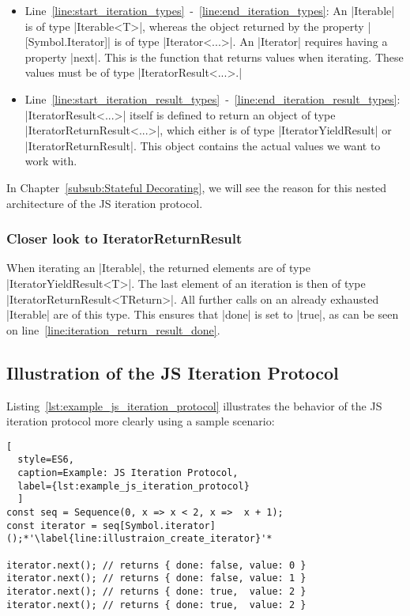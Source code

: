 \begin{itemize}
  \item{Line~\ref{line:start_iteration_types}~-~\ref{line:end_iteration_types}: 
      An |Iterable| is of type |Iterable<T>|, whereas the object returned by the property
      |[Symbol.Iterator]| is of type |Iterator<...>|. An |Iterator| requires having a property |next|. 
      This is the function that returns values when iterating. These values must be 
      of type |IteratorResult<...>.|
    }
  \item{Line~\ref{line:start_iteration_result_types}~-~\ref{line:end_iteration_result_types}:
      |IteratorResult<...>| itself is defined to return an 
      object of type |IteratorReturnResult<...>|, which either is of type
      |IteratorYieldResult| or |IteratorReturnResult|. This object contains the actual 
      values we want to work with.}
\end{itemize}

In Chapter~\ref{subsub:Stateful Decorating}, we will see the reason for this
nested architecture of the JS iteration protocol.

\subsubsection{Closer look to IteratorReturnResult}
\label{subsub:Closer look to IteratorReturnResult}
When iterating an |Iterable|, the returned elements are of type
|IteratorYieldResult<T>|. The last element of an iteration is then of type
|IteratorReturnResult<TReturn>|. All further calls on an already exhausted
|Iterable| are of this type. This ensures that |done| is set to |true|, as 
can be seen on line~\ref{line:iteration_return_result_done}.


\subsection{Illustration of the JS Iteration Protocol}
\label{sub:Illustration of the JS Iteration Protocol}
Listing~\ref{lst:example_js_iteration_protocol} illustrates the behavior of the
JS iteration protocol more clearly using a sample scenario:

\begin{lstlisting}[
  style=ES6, 
  caption=Example: JS Iteration Protocol,
  label={lst:example_js_iteration_protocol}
  ]
const seq = Sequence(0, x => x < 2, x =>  x + 1); 
const iterator = seq[Symbol.iterator]();*'\label{line:illustraion_create_iterator}'*

iterator.next(); // returns { done: false, value: 0 }
iterator.next(); // returns { done: false, value: 1 }
iterator.next(); // returns { done: true,  value: 2 }
iterator.next(); // returns { done: true,  value: 2 }
\end{lstlisting}

